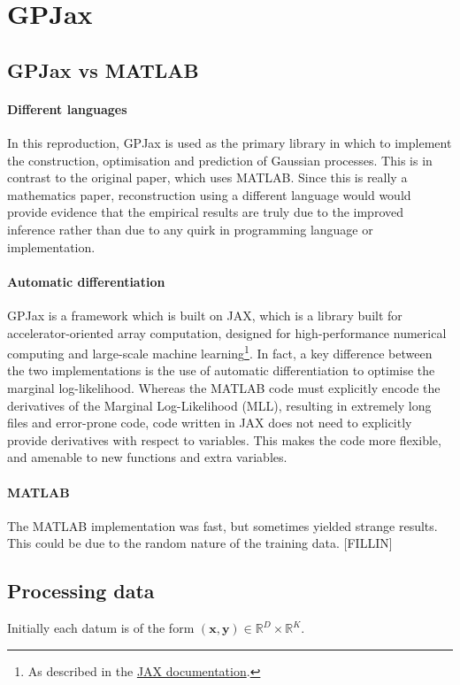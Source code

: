\documentclass[12pt,a4paper,twoside]{report}
\theoremstyle{definition}
\begin{document}
\section{GPJax}
\subsection{GPJax vs MATLAB}
\paragraph{Different languages}
In this reproduction, GPJax is used as the primary library in which to implement the construction, optimisation and prediction of Gaussian processes. This is in contrast to the original paper, which uses MATLAB. Since this is really a mathematics paper, reconstruction using a different language would would provide evidence that the empirical results are truly due to the improved inference rather than due to any quirk in programming language or implementation.

\paragraph{Automatic differentiation}
GPJax is a framework which is built on JAX, which is a library built for accelerator-oriented array computation, designed for high-performance numerical computing and large-scale machine learning\footnote{As described in the \href{https://jax.readthedocs.io/en/latest/}{JAX documentation}.}. In fact, a key difference between the two implementations is the use of automatic differentiation to optimise the marginal log-likelihood. Whereas the MATLAB code must explicitly encode the derivatives of the Marginal Log-Likelihood (MLL)\label{MLL}, resulting in extremely long files and error-prone code, code written in JAX does not need to explicitly provide derivatives with respect to variables. This makes the code more flexible, and amenable to new functions and extra variables.

\paragraph{MATLAB}
The MATLAB implementation was fast, but sometimes yielded strange results. This could be due to the random nature of the training data. [FILLIN]

\subsection{Processing data}
Initially each datum is of the form $(\mathbf x,\mathbf y)\in\mathbb{R}^D\times \mathbb{R}^K$.
\end{document}
